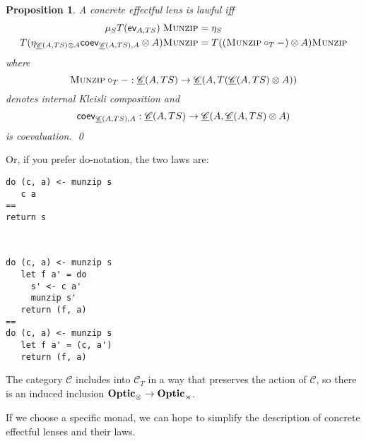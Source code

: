 \documentclass[11pt,letterpaper]{article}
\theoremstyle{plain}
\newtheorem{proposition}[theorem]{Proposition}
\theoremstyle{definition}
\newtheorem{definition}[theorem]{Definition}
\newcommand{\C}{\mathscr{C}}
\newcommand{\homC}{\underline{\C}}
\newcommand{\Optic}{\mathbf{Optic}}
\newcommand{\munzip}{\textsc{Munzip}}
\begin{document}
\begin{proposition}
A concrete effectful lens is lawful iff
  \begin{align*}
    \mu_S T(\ev_{A, TS}) \; \munzip &= \eta_S \\
    T(\eta_{\homC(A, TS) \otimes A}\coev_{\homC(A, TS), A} \otimes A)\munzip &= T((\munzip \circ_T -) \otimes A)\munzip
  \end{align*}
  where \[ \munzip \circ_T - : \homC(A, TS) \to \homC(A, T(\homC(A, TS) \otimes A)) \] denotes internal Kleisli composition and \[\coev_{\homC(A, TS), A} : \homC(A, TS) \to \homC(A, \homC(A, TS) \otimes A) \] is coevaluation. \qed
\end{proposition}
  Or, if you prefer do-notation, the two laws are:
\begin{multicols}{2}
\begin{verbatim}
do (c, a) <- munzip s
   c a
==
return s
\end{verbatim} 
~\columnbreak
\begin{verbatim}
do (c, a) <- munzip s
   let f a' = do
     s' <- c a'
     munzip s'
   return (f, a)
==
do (c, a) <- munzip s
   let f a' = (c, a')
   return (f, a)
\end{verbatim}
\end{multicols}

The category $\C$ includes into $\C_T$ in a way that preserves the action of $\C$, so there is an induced inclusion $\Optic_\otimes \to \Optic_\monact$.

If we choose a specific monad, we can hope to simplify the description of concrete effectful lenses and their laws.

%
%
%
\end{document}
